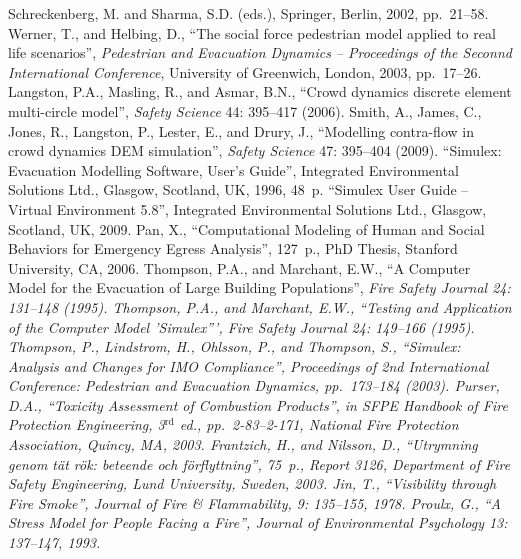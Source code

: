 \documentclass[12pt,a4paper,final,twoside]{stylevk}
\begin{document}
\begin{thebibliography}{99}
  Schreckenberg, M. and Sharma, S.D. (eds.), Springer, Berlin, 2002,
  pp.~21--58.
%
 Werner, T., and Helbing, D., ``The social force
  pedestrian model applied to real life scenarios'', \emph{Pedestrian
    and Evacuation Dynamics -- Proceedings of the Seconnd International
    Conference}, University of Greenwich, London, 2003, pp.~17--26.
%
 Langston, P.A., Masling, R., and Asmar, B.N.,
  ``Crowd dynamics discrete element multi-circle model'', \emph{Safety
    Science} 44: 395--417 (2006).
%
 Smith, A., James, C., Jones, R., Langston, P.,
  Lester, E., and Drury, J., ``Modelling contra-flow in crowd dynamics
  DEM simulation'', \emph{Safety Science} 47: 395--404 (2009).
%
 ``Simulex: Evacuation Modelling Software, User's
  Guide'', Integrated Environmental Solutions Ltd., Glasgow, Scotland,
  UK, 1996, 48~p.
%
 ``Simulex User Guide -- Virtual Environment 5.8'',
  Integrated Environmental Solutions Ltd., Glasgow, Scotland, UK,
  2009.
%
 Pan, X., ``Computational Modeling of Human and Social
  Behaviors for Emergency Egress Analysis'', 127~p., PhD Thesis,
  Stanford University, CA, 2006.
%
 Thompson, P.A., and Marchant, E.W., ``A Computer
  Model for the Evacuation of Large Building Populations'', \em Fire
  Safety Journal \em 24: 131--148 (1995).
%
 Thompson, P.A., and Marchant, E.W., ``Testing
  and Application of the Computer Model 'Simulex''', \em Fire Safety
  Journal \em 24: 149--166 (1995).
%
 Thompson, P., Lindstrom, H., Ohlsson, P., and
  Thompson, S., ``Simulex: Analysis and Changes for IMO Compliance'',
  Proceedings of 2nd International Conference: Pedestrian and
  Evacuation Dynamics, pp.~173--184 (2003).
%
 Purser, D.A., ``Toxicity Assessment of Combustion
  Products'', in \emph{SFPE Handbook of Fire Protection Engineering},
  3${}^\textrm{rd}$ ed., pp.~2-83--2-171, National Fire Protection
  Association, Quincy, MA, 2003.
%
 Frantzich, H., and Nilsson, D., ``Utrymning
  genom t\"at r\"ok: beteende och f\"orflyttning'', 75~p., Report 3126,
  Department of Fire Safety Engineering, Lund University, Sweden,
  2003.
%
 Jin, T., ``Visibility through Fire Smoke'',
  \emph{Journal of Fire \& Flammability}, 9: 135--155, 1978.
%
 Proulx, G., ``A Stress Model for People Facing a
  Fire'', \emph{Journal of Environmental Psychology} 13: 137--147,
  1993.
%

\end{thebibliography}
\end{document}
